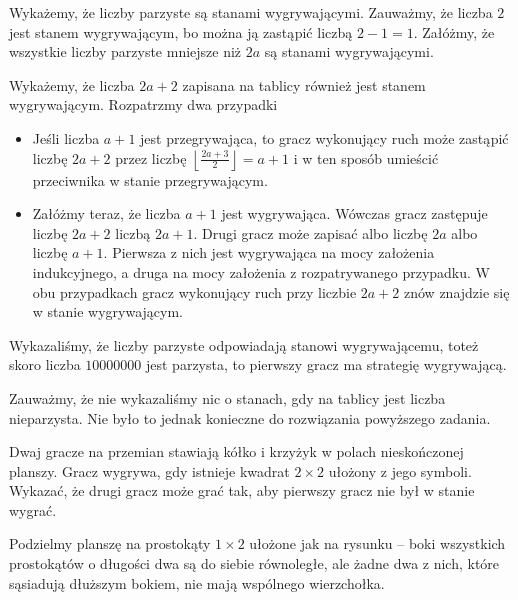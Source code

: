 \noindent
Wykażemy, że liczby parzyste są stanami wygrywającymi. Zauważmy, że liczba $2$ jest stanem wygrywającym, bo można ją zastąpić liczbą $2 - 1 = 1$. Załóżmy, że wszystkie liczby parzyste mniejsze niż $2a$ są stanami wygrywającymi.

\vspace{10px}
\noindent
Wykażemy, że liczba $2a + 2$ zapisana na tablicy również jest stanem wygrywającym. Rozpatrzmy dwa przypadki
\begin{itemize}
	\item Jeśli liczba $a + 1$ jest przegrywająca, to gracz wykonujący ruch może zastąpić liczbę $2a + 2$ przez liczbę $\left\lfloor\frac{2a + 3}{2}\right\rfloor = a + 1$ i w ten sposób umieścić przeciwnika w stanie przegrywającym.
	\item Załóżmy teraz, że liczba $a + 1$ jest wygrywająca. Wówczas gracz zastępuje liczbę $2a + 2$ liczbą $2a + 1$. Drugi gracz może zapisać albo liczbę $2a$ albo liczbę $a + 1$. Pierwsza z nich jest wygrywająca na mocy założenia indukcyjnego, a druga na mocy założenia z rozpatrywanego przypadku. W obu przypadkach gracz wykonujący ruch przy liczbie $2a + 2$ znów znajdzie się w stanie wygrywającym.
\end{itemize}

\vspace{10px}
\noindent
Wykazaliśmy, że liczby parzyste odpowiadają stanowi wygrywającemu, toteż skoro liczba $10000000$ jest parzysta, to pierwszy gracz ma strategię wygrywającą.

\begin{remark}
	Zauważmy, że nie wykazaliśmy nic o stanach, gdy na tablicy jest liczba nieparzysta. Nie było to jednak konieczne do rozwiązania powyższego zadania.
\end{remark}

\newpage

\begin{problem}{4}
	Dwaj gracze na przemian stawiają kółko i krzyżyk w polach nieskończonej planszy. Gracz wygrywa, gdy istnieje kwadrat $2\times2$ ułożony z jego symboli. Wykazać, że drugi gracz może grać tak, aby pierwszy gracz nie był w stanie wygrać.
\end{problem}

\noindent
Podzielmy planszę na prostokąty $1 \times 2$ ułożone jak na rysunku -- boki wszystkich prostokątów o długości dwa są do siebie równoległe, ale żadne dwa z nich, które sąsiadują dłuższym bokiem, nie mają wspólnego wierzchołka.

